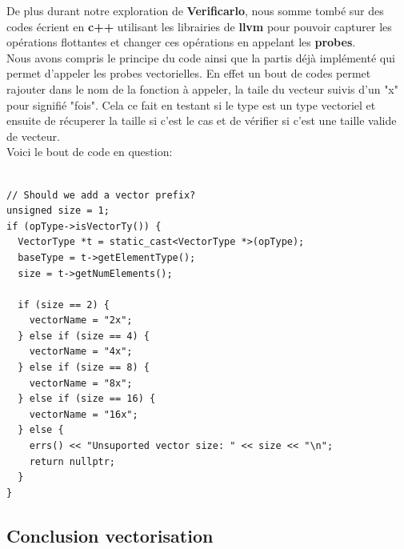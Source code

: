 \documentclass[11pt]{article}
\begin{document}
De plus durant notre exploration de \textbf{Verificarlo}, nous somme tombé sur des
codes écrient en \textbf{c++} utilisant les librairies de \textbf{llvm} pour pouvoir
capturer les opérations flottantes et changer ces opérations en appelant les
\textbf{probes}.
\\ \vspace{5mm}
Nous avons compris le principe du code ainsi que la partis déjà implémenté
qui permet d'appeler les probes vectorielles. En effet un bout de codes
permet rajouter dans le nom de la fonction à appeler, la taile du vecteur
suivis d'un "x" pour signifié "fois". Cela ce fait en testant si le type est
un type vectoriel et ensuite de récuperer la taille si c'est le cas et de
vérifier si c'est une taille valide de vecteur.
\\ \vspace{5mm}
Voici le bout de code en question:

\begin{verbatim}

// Should we add a vector prefix?
unsigned size = 1;
if (opType->isVectorTy()) {
  VectorType *t = static_cast<VectorType *>(opType);
  baseType = t->getElementType();
  size = t->getNumElements();

  if (size == 2) {
    vectorName = "2x";
  } else if (size == 4) {
    vectorName = "4x";
  } else if (size == 8) {
    vectorName = "8x";
  } else if (size == 16) {
    vectorName = "16x";
  } else {
    errs() << "Unsuported vector size: " << size << "\n";
    return nullptr;
  }
}

\end{verbatim}

\subsection{Conclusion vectorisation}
\label{sec:org947b424}
\end{document}
